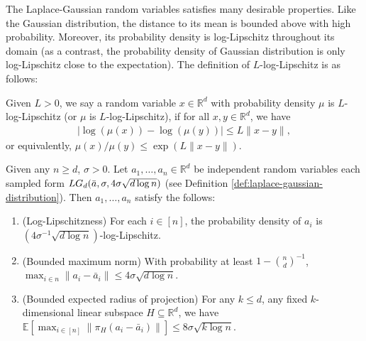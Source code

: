 \documentclass{article}\usepackage[a4paper,margin=20mm]{geometry}
\newcommand{\R}{\mathbb R}
\newcommand{\E}{\mathbb E}
\renewcommand{\subset}{\subseteq}
\begin{document}
The Laplace-Gaussian random variables satisfies many desirable properties. Like the
Gaussian distribution, the distance to its mean is bounded above with high
probability. Moreover, its probability density is log-Lipschitz throughout its
domain (as a contrast, the probability density of Gaussian distribution is only
log-Lipschitz close to the expectation).  The definition of $L$-log-Lipschitz
is as follows:

\begin{definition}\label{def:log-lipschitz}
    Given $L > 0$, we say a random variable $x \in \R^d$ with probability density $\mu$ is $L$-log-Lipschitz (or $\mu$ is $L$-log-Lipschitz), if for all $x, y\in \R^d$, we have
    \begin{align*}
        |\log(\mu(x)) - \log(\mu(y))| \leq L\|x - y\|,
    \end{align*}
    or equivalently, $\mu(x) / \mu(y) \leq \exp(L\|x - y\|)$.
\end{definition}

\begin{lemma}\label{lem:properties-laplace-gaussian}
    Given any $n \geq d$, $\sigma > 0$. Let $a_1, \ldots, a_n \in \R^d$ be independent random variables each sampled form $LG_d(\Bar{a}, \sigma, 4\sigma \sqrt{d \log n})$ (see Definition \ref{def:laplace-gaussian-distribution}).
    Then $a_1, \ldots, a_n$ satisfy the follows:
    \begin{enumerate}
        \item (Log-Lipschitzness) For each $i \in [n]$, the probability density of $a_i$ is $(4\sigma^{-1} \sqrt{d\log n})$-log-Lipschitz.
        \item (Bounded maximum norm) 
        With probability at least $1 - \binom{n}{d}^{-1}$, $\max_{i \in n} \|a_i - \bar{a}_i\| \leq 4\sigma \sqrt{d \log n}$.%
        \item (Bounded expected radius of projection)  For any $k \leq d$, any fixed $k$-dimensional linear subspace $H \subset \R^d$, we have $\E[\max_{i \in [n]}\|\pi_H(a_i - \bar{a}_i)\|] \leq 8\sigma\sqrt{k\log n}$.%
    \end{enumerate}
\end{lemma}
\end{document}
